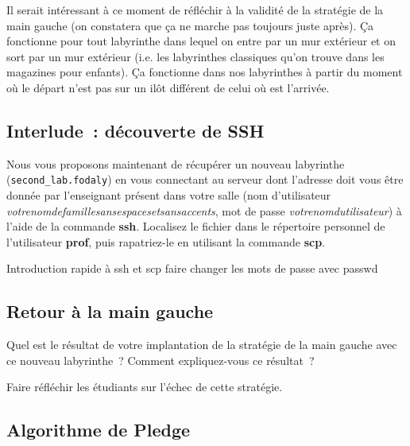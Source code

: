 \documentclass[a4paper]{article}
\newenvironment{enseignants}[1]{\noindent\color{blue}{\bf #1}}{}
\begin{document}
\begin{enseignants}{Réflexion à avoir avec les étudiants une fois l'implantation de la stratégie de la main gauche terminée~:}
Il serait intéressant à ce moment de réfléchir à la validité de la stratégie de la main gauche (on constatera que ça ne marche pas toujours juste après). Ça fonctionne pour tout labyrinthe dans lequel on entre par un mur extérieur et on sort par un mur extérieur (i.e. les labyrinthes classiques qu'on trouve dans les magazines pour enfants). Ça fonctionne dans nos labyrinthes à partir du moment où le départ n'est pas sur un ilôt différent de celui où est l'arrivée.
\end{enseignants}

\subsection{Interlude~: découverte de SSH}

Nous vous proposons maintenant de récupérer un nouveau labyrinthe (\verb|second_lab.fodaly|) en vous connectant au serveur dont l'adresse doit vous être donnée par l'enseignant présent dans votre salle (nom d'utilisateur \textit{votrenomdefamillesansespacesetsansaccents}, mot de passe \textit{votrenomdutilisateur}) à l'aide de la commande \textbf{ssh}.
Localisez le fichier dans le répertoire personnel de l'utilisateur \textbf{prof}, puis rapatriez-le en utilisant la commande \textbf{scp}.

\begin{enseignants}{SSH~:}
  Introduction rapide à ssh et scp
  faire changer les mots de passe avec passwd
\end{enseignants}

\subsection{Retour à la main gauche}

Quel est le résultat de votre implantation de la stratégie de la main gauche avec ce nouveau labyrinthe~? Comment expliquez-vous ce résultat~?

\begin{enseignants}{Suite de la réflexion précédente~:}
Faire réfléchir les étudiants sur l’échec de cette stratégie.
\end{enseignants}

\subsection{Algorithme de Pledge}
\end{document}
